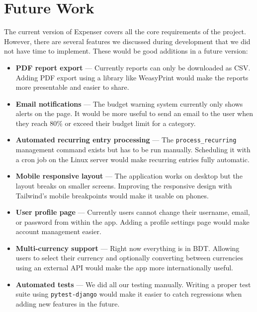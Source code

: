 \documentclass[12pt,a4paper]{report}
\begin{document}
\chapter{Future Work}

The current version of Expenser covers all the core requirements of the project. However, there are several features we discussed during development that we did not have time to implement. These would be good additions in a future version:

\begin{itemize}[itemsep=5pt]
  \item \textbf{PDF report export} --- Currently reports can only be downloaded as CSV. Adding PDF export using a library like WeasyPrint would make the reports more presentable and easier to share.

  \item \textbf{Email notifications} --- The budget warning system currently only shows alerts on the page. It would be more useful to send an email to the user when they reach 80\% or exceed their budget limit for a category.

  \item \textbf{Automated recurring entry processing} --- The \texttt{process\_recurring} management command exists but has to be run manually. Scheduling it with a cron job on the Linux server would make recurring entries fully automatic.

  \item \textbf{Mobile responsive layout} --- The application works on desktop but the layout breaks on smaller screens. Improving the responsive design with Tailwind's mobile breakpoints would make it usable on phones.

  \item \textbf{User profile page} --- Currently users cannot change their username, email, or password from within the app. Adding a profile settings page would make account management easier.

  \item \textbf{Multi-currency support} --- Right now everything is in BDT. Allowing users to select their currency and optionally converting between currencies using an external API would make the app more internationally useful.

  \item \textbf{Automated tests} --- We did all our testing manually. Writing a proper test suite using \texttt{pytest-django} would make it easier to catch regressions when adding new features in the future.
\end{itemize}
\end{document}

